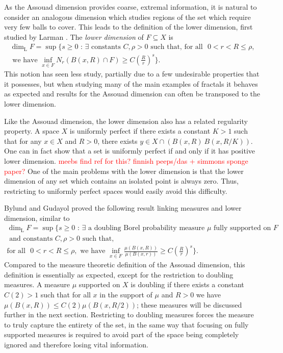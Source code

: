 As the Assouad dimension provides coarse, extremal information, it is natural to consider an analogous dimension which studies regions of the set which require very few balls to cover. This leads to the definition of the lower dimension, first studied by Larman \cite{larman1,larman2}. The \textit{lower dimension} of $F \subseteq X$ is 
\begin{multline*}
\dim_{\text{L}} F = \sup \Bigg\{ s \geq 0 \, \,  : \, \exists \text{ constants }C, \rho > 0 \text{ such that, for all } \, \, 0< r< R \leq \rho,\\ \text{ we have  }\inf_{x\in F} N_r (B(x,R)\cap F) \geq C\left(\frac{R}{r}\right)^{s} \Bigg\}.
\end{multline*}
This notion has seen less study, partially due to a few undesirable properties that it possesses, but when studying many of the main examples of fractals it behaves as expected and results for the Assouad dimension can often be transposed to the lower dimension. 

Like the Assouad dimension, the lower dimension also has a related regularity property. A space $X$ is uniformly perfect if there exists a constant $K > 1$ such that for any $x \in X$ and $R > 0$, there exists $y \in X \cap \left(B(x, R) \ B(x, R/K)\right)$. One can in fact show that a set is uniformly perfect if and only if it has positive lower dimension. \textcolor{red}{meebs find ref for this? finnish peeps/das + simmons sponge paper?} One of the main problems with the lower dimension is that the lower dimension of any set which contains an isolated point is always zero. Thus, restricting to uniformly perfect spaces would easily avoid this difficulty. 

Bylund and Gudayol \cite{bylund-g} proved the following result linking measures and lower dimension, similar to \cite{luksak-saksman, konyagin-volberg}
\begin{multline*}
\dim_{\text{L}} F = \sup \Bigg\{ s \geq 0 \, \,  : \, \exists \text{ a doubling Borel probability measure } \mu \text{ fully supported on }F \\ \text{ and constants }C, \rho > 0  \text{ such that, } \\ \text{for all } \, \, 0< r< R \leq \rho, \text{ we have  }\inf_{x\in F} \frac{\mu(B(x,R))}{\mu(B(x,r))} \geq C\left(\frac{R}{r}\right)^{s} \Bigg\}.
\end{multline*}
Compared to the measure theoretic definition of the Assouad dimension, this definition is essentially as expected, except for the restriction to doubling measures. A measure $\mu$ supported on $X$ is doubling if there exists a constant $C(2) > 1$ such that for all $x$ in the support of $\mu$ and $R > 0$ we have $\mu( B(x,R)) \le C(2) \mu(B(x,R/2))$; these measures will be discussed further in the next section. Restricting to doubling measures forces the measure to truly capture the entirety of the set, in the same way that focusing on fully supported measures is required to avoid part of the space being completely ignored and therefore losing vital information.


